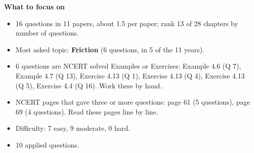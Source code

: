 \begin{minipage}[t]{0.63\linewidth}{\small\textbf{\color{crimson}What to focus on}\par\smallskip
\begin{itemize}[leftmargin=1.1em,itemsep=1pt,topsep=0pt]
\item 16 questions in 11 papers, about 1.5 per paper; rank 13 of 28 chapters by number of questions.
\item Most asked topic: \textbf{Friction} (6 questions, in 5 of the 11 years).
\item 6 questions are NCERT solved Examples or Exercises: Example 4.6 (Q 7), Example 4.7 (Q 13), Exercise 4.13 (Q 1), Exercise 4.13 (Q 4), Exercise 4.13 (Q 5), Exercise 4.4 (Q 16). Work these by hand.
\item NCERT pages that gave three or more questions: page 61 (5 questions), page 69 (4 questions). Read these pages line by line.
\item Difficulty: 7 easy, 9 moderate, 0 hard.
\item 10 applied questions.
\end{itemize}}\end{minipage}\par
{}
